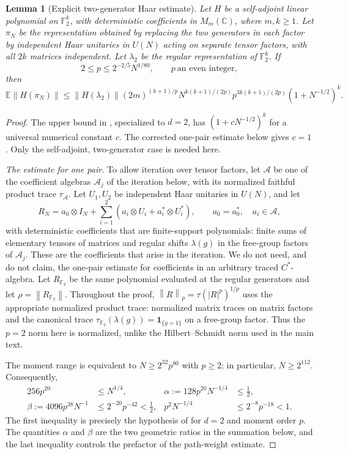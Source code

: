 \documentclass[11pt]{article}
\numberwithin{equation}{section}
\newtheorem{lemma}[theorem]{Lemma}
\theoremstyle{boldremark}\newtheorem{remark}[theorem]{Remark}
\newcommand{\C}{\mathbb C}
\newcommand{\F}{\mathbb F}
\newcommand{\E}{\mathbb E}
\newcommand{\M}{M}
\newcommand{\norm}[1]{\left\lVert #1\right\rVert}
\begin{document}
\begin{lemma}[Explicit two-generator Haar estimate]
\label{lem:haar}
Let $H$ be a self-adjoint linear polynomial on $\F_2^k$, with
deterministic coefficients in $\M_m(\C)$, where $m,k\ge1$.
Let $\pi_N$ be the representation obtained by replacing the two
generators in each factor by independent Haar unitaries in $U(N)$
acting on separate tensor factors, with all $2k$ matrices independent.
Let $\lambda_2$ be the regular representation of $\F_2^k$. If
\begin{equation}
 2\le p\le2^{-2/5}N^{1/80},\qquad
 p\ \text{an even integer},
 \label{eq:haar-hypotheses}
\end{equation}
then
\[
 \E\norm{H(\pi_N)}\le\norm{H(\lambda_2)}
 (2m)^{(k+1)/p}N^{k(k+1)/(2p)}
 p^{3k(k+1)/(2p)}(1+N^{-1/2})^k.
\]
\end{lemma}
\begin{proof}
The upper bound in \cite[Lemma~9.3]{BC}, specialized to $d=2$,
has $(1+cN^{-1/2})^k$ for a universal numerical constant $c$.
The corrected one-pair estimate below gives $c=1$.
Only the self-adjoint, two-generator case is needed here.

\emph{The estimate for one pair.}
To allow iteration over tensor factors, let $\mathcal A$ be one of
the coefficient algebras $\mathcal A_j$ of the iteration below, with
its normalized faithful product trace $\tau_{\mathcal A}$.
Let $U_1,U_2$ be independent Haar unitaries in $U(N)$, and let
\[
 R_N=a_0\otimes I_N+
       \sum_{i=1}^2(a_i\otimes U_i+a_i^*\otimes U_i^*),
 \qquad a_0=a_0^*,\quad a_i\in\mathcal A,
\]
with deterministic coefficients that are finite-support polynomials:
finite sums of elementary tensors of matrices and regular shifts
$\lambda(g)$ in the free-group factors of $\mathcal A_j$.
These are the coefficients that arise in the iteration. We do not
need, and do not claim, the one-pair estimate for coefficients in an
arbitrary traced $C^*$-algebra. Let $R_{\F_2}$ be the same
polynomial evaluated at the regular generators and let
$\rho=\norm{R_{\F_2}}$.
Throughout the proof, $\norm R_p=\tau(|R|^p)^{1/p}$ uses the
appropriate normalized product trace: normalized matrix traces
on matrix factors and the canonical trace
$\tau_{\F_2}(\lambda(g))=\mathbf1_{\{g=1\}}$ on a free-group factor.
Thus the $p=2$ norm here is normalized, unlike the Hilbert--Schmidt
norm used in the main text.

The moment range is equivalent to $N\ge2^{32}p^{80}$ with
$p\ge2$; in particular, $N\ge2^{112}$. Consequently,
\[
\begin{aligned}
 256p^{20}&\le N^{1/4},&
 \alpha:=128p^{20}N^{-1/4}&\le\tfrac12,\\
 \beta:=4096p^{38}N^{-1}&\le2^{-20}p^{-42}<\tfrac12,&
 p^2N^{-1/4}&\le2^{-8}p^{-18}<1.
\end{aligned}
\]
The first inequality is precisely the hypothesis of
\cite[Theorem~5.1]{BC} for $d=2$ and moment order $p$.
The quantities $\alpha$ and $\beta$ are the two geometric ratios in
the summation below, and the last inequality controls the prefactor
of the path-weight estimate.


\end{proof}
\end{document}
